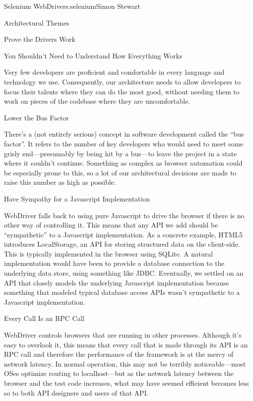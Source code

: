 \begin{aosachapter}{Selenium WebDriver}{s:selenium}{Simon Stewart}
\begin{aosasect1}{Architectural Themes}
\begin{aosasect2}{Prove the Drivers Work}
\end{aosasect2}

\begin{aosasect2}{You Shouldn't Need to Understand How Everything Works}

Very few developers are proficient and comfortable in every language
and technology we use. Consequently, our architecture needs to allow
developers to focus their talents where they can do the most good,
without needing them to work on pieces of the codebase where they are
uncomfortable.

\end{aosasect2}

\begin{aosasect2}{Lower the Bus Factor}

There's a (not entirely serious) concept in software development
called the ``bus factor''. It refers to the number of key developers
who would need to meet some grisly end---presumably by being hit by a
bus---to leave the project in a state where it couldn't
continue. Something as complex as browser automation could be
especially prone to this, so a lot of our architectural decisions are
made to raise this number as high as possible.

\end{aosasect2}

\begin{aosasect2}{Have Sympathy for a Javascript Implementation}

WebDriver falls back to using pure Javascript to drive the browser if
there is no other way of controlling it. This means that any API we
add should be ``sympathetic'' to a Javascript implementation.
As a concrete example, HTML5 introduces LocalStorage, an API for
storing structured data on the client-side. This is typically
implemented in the browser using SQLite. A natural implementation
would have been to provide a database connection to the underlying
data store, using something like JDBC\@.
Eventually, we settled on an API that closely models the underlying
Javascript implementation because something that modeled typical
database access APIs wasn't sympathetic to a Javascript implementation.

\end{aosasect2}

\begin{aosasect2}{Every Call Is an RPC Call}

WebDriver controls browsers that are running in other processes. Although
it's easy to overlook it, this means that every call that is made
through its API is an RPC call and therefore the performance of the
framework is at the mercy of network latency. In normal operation,
this may not be terribly noticeable---most OSes optimize routing to
localhost---but as the network latency between the browser and the
test code increases, what may have seemed efficient becomes less so to
both API designers and users of that API.


\end{aosasect2}
\end{aosasect1}
\end{aosachapter}
